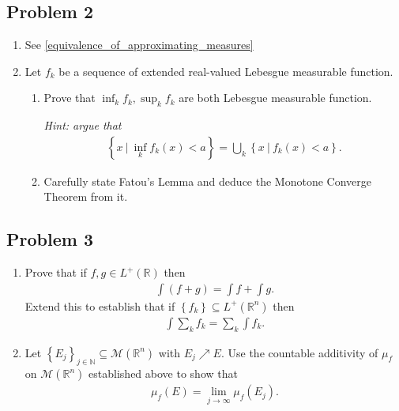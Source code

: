 \hypertarget{problem-2-2}{%
\subsection{Problem 2}\label{problem-2-2}}

\begin{enumerate}
\def\labelenumi{\alph{enumi}.}
\item
  See \cref{equivalence_of_approximating_measures}
\item
  Let \(f_k\) be a sequence of extended real-valued Lebesgue measurable
  function.

  \begin{enumerate}
  \def\labelenumii{\roman{enumii}.}
  \item
    Prove that \(\inf_k f_k, \sup_k f_k\) are both Lebesgue measurable
    function.

    \emph{Hint: argue that}
    \begin{align*}
    \left\{{x {~\mathrel{\Big|}~}\inf_k f_k(x) < a}\right\} = \displaystyle\bigcup_k \left\{{x {~\mathrel{\Big|}~}f_k(x) < a}\right\}
    .\end{align*}
  \item
    Carefully state Fatou's Lemma and deduce the Monotone Converge
    Theorem from it.
  \end{enumerate}
\end{enumerate}

\hypertarget{problem-3-2}{%
\subsection{Problem 3}\label{problem-3-2}}

\begin{enumerate}
\def\labelenumi{\alph{enumi}.}
\item
  Prove that if \(f, g\in L^+({\mathbb{R}})\) then
  \begin{align*}
  \int(f +g) = \int f + \int g
  .\end{align*}
  Extend this to establish that if
  \(\left\{{ f_k}\right\} \subseteq L^+({\mathbb{R}}^n)\) then
  \begin{align*}
    \int \sum_k f_k = \sum_k \int f_k
    .\end{align*}
\item
  Let
  \(\left\{{E_j}\right\}_{j\in {\mathbb{N}}} \subseteq \mathcal{M}({\mathbb{R}}^n)\)
  with \(E_j \nearrow E\). Use the countable additivity of \(\mu_f\) on
  \(\mathcal{M}({\mathbb{R}}^n)\) established above to show that
  \begin{align*}
    \mu_f(E) = \lim_{j\to \infty } \mu_f(E_j)
    .\end{align*}
\end{enumerate}

